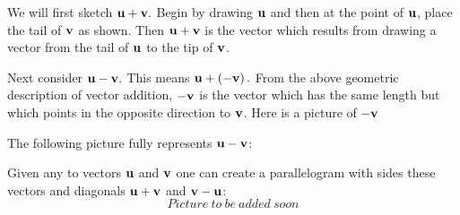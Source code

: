 \begin{solution}
We will first sketch ${\bf u}+{\bf v}.$ Begin by drawing ${\bf u}$
and then at the point of ${\bf u}$, place the tail of ${\bf v}$ as
shown. Then ${\bf u}+{\bf v}$ is the vector which results from
drawing a vector from the tail of ${\bf u}$ to the tip of ${\bf v}$.

\begin{center}
\end{center}

Next consider ${\bf u}-{\bf v}.$ This means ${\bf u}+\left( -{\bf v}
\right) .$ From the above geometric description of vector addition, $-{\bf v}$ 
is the vector which has the same length but which points in the
opposite direction to ${\bf v}$. Here is a picture of $-{\bf v}$ 

\begin{center}
\end{center}

The following picture fully represents ${\bf u}-{\bf v}$:

\begin{center}
\end{center}
\end{solution}

Given any to vectors ${\bf u}$ and ${\bf v}$ one can create a parallelogram with sides these vectors and diagonals ${\bf u}+{\bf v}$ and ${\bf v}-{\bf u}$: $$Picture \ to \ be \ added \ soon$$ 

